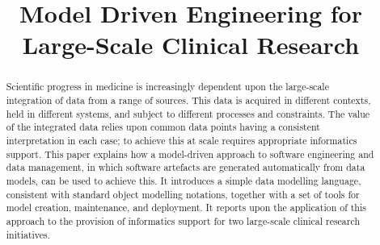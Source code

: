 \documentclass[conference]{IEEEtran}
\begin{document}
 

\title{Model Driven Engineering for \\ Large-Scale Clinical Research}

\vskip 4mm 

\author{%
}

\ifpdf
\graphicspath{{ASEFigs/}}
\fi

\maketitle

\begin{abstract}
  Scientific progress in medicine is increasingly dependent upon the
  large-scale integration of data from a range of sources.  This data
  is acquired in different contexts, held in different systems, and
  subject to different processes and constraints.  The value of the
  integrated data relies upon common data points having a consistent
  interpretation in each case; to achieve this at scale requires
  appropriate informatics support.  This paper explains how a
  model-driven approach to software engineering and data management,
  in which software artefacts are generated automatically from data
  models, can be used to achieve this.  It introduces a simple data
  modelling language, consistent with standard object modelling
  notations, together with a set of tools for model creation,
  maintenance, and deployment.  It reports upon the application of
  this approach to the provision of informatics support for two
  large-scale clinical research initiatives.
\end{abstract}

% 


\vskip 14mm

\noindent






 


\newpage




\end{document}
